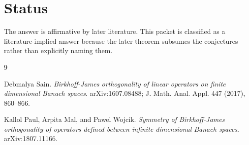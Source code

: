 \documentclass[11pt]{article}
\begin{document}
\section*{Status}

The answer is affirmative by later literature. This packet is classified as a
literature-implied answer because the later theorem subsumes the conjectures
rather than explicitly naming them.

\begin{thebibliography}{9}

Debmalya Sain.
\newblock \emph{Birkhoff-James orthogonality of linear operators on finite
dimensional Banach spaces}.
\newblock arXiv:1607.08488; J. Math. Anal. Appl. 447 (2017), 860--866.

Kallol Paul, Arpita Mal, and Pawel Wojcik.
\newblock \emph{Symmetry of Birkhoff-James orthogonality of operators defined
between infinite dimensional Banach spaces}.
\newblock arXiv:1807.11166.

\end{thebibliography}
\end{document}
